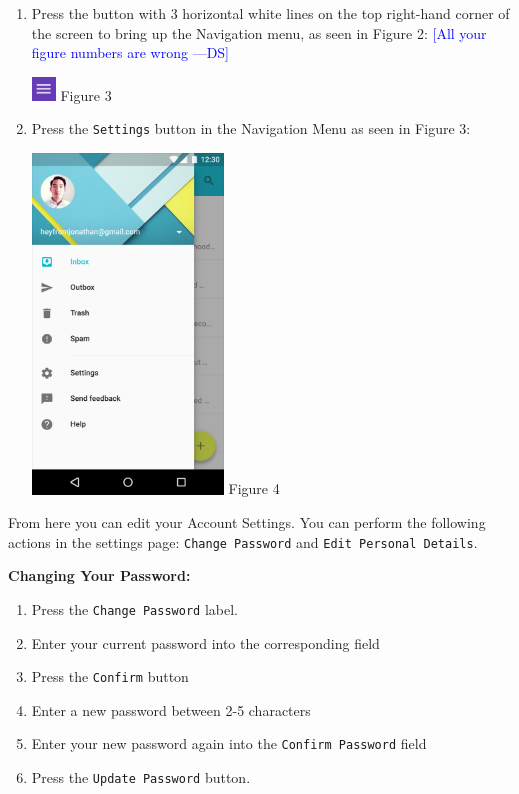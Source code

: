 \documentclass[12pt, titlepage]{article}
\newcommand{\authornote}[3]{\textcolor{#1}{[#3 ---#2]}}
\newcommand{\authornote}[3]{}
\newcommand{\ds}[1]{\authornote{blue}{DS}{#1}}
\begin{document}
\begin{enumerate}
	\item Press the button with 3 horizontal white lines on the top right-hand corner of the screen to bring up the Navigation menu, as seen 			in Figure 2: 
	\ds{All your figure numbers are wrong}
	\begin{center}
	\includegraphics[width=0.05\textwidth]{ui-fragment-button.png}
	\linebreak Figure 3
	\end{center}

	\item Press the \texttt{Settings} button in the Navigation Menu as seen 	in Figure 3:

	\begin{center}
	\includegraphics[width=0.4\textwidth]{nav-menu.png}
	\linebreak Figure 4
	\end{center}

\end{enumerate}

From here you can edit your Account Settings. You can perform the following actions in the settings page: \texttt{Change Password} and \texttt{Edit Personal Details}.

\textbf{Changing Your Password:}
	\begin{enumerate}
		\item Press the \texttt{Change Password} label.
		\item Enter your current password into the corresponding field
		\item Press the \texttt{Confirm} button
		\item Enter a new password between 2-5 characters
		\item Enter your new password again into the \texttt{Confirm Password} field
		\item Press the \texttt{Update Password} button.
	\end{enumerate}
	
\end{document}
